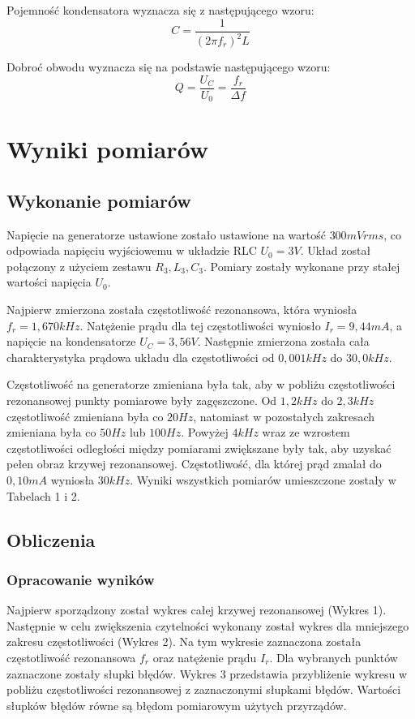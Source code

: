 \documentclass[polish, 11pt, a4paper]{article}
\begin{document}
		Pojemność kondensatora wyznacza się z następującego wzoru:
		\begin{equation}
			C	=	\frac{1}{(2\pi f_r)^2L}
		\end{equation}
		
		Dobroć obwodu wyznacza się na podstawie następującego wzoru:
		\begin{equation}
			Q=\frac{U_C}{U_0}=\frac{f_r}{\Delta f}
		\end{equation}
	\section{Wyniki pomiarów}

	\subsection{Wykonanie pomiarów}
		Napięcie na generatorze ustawione zostało ustawione na wartość \(300mVrms\), co odpowiada napięciu wyjściowemu w układzie RLC \(U_0=3V\).
		Układ został połączony z użyciem zestawu \(R_3, L_3, C_3\).
		Pomiary zostały wykonane przy stałej wartości napięcia \(U_0\).
		
		Najpierw zmierzona została częstotliwość rezonansowa, która wyniosła \(f_r=1,670kHz\).
		Natężenie prądu dla tej częstotliwości wyniosło \(I_r=9,44mA\), a napięcie na kondensatorze \(U_C=3,56V\).
		Następnie zmierzona została cała charakterystyka prądowa układu dla częstotliwości od \(0,001kHz\) do \(30,0kHz\).
		
		Częstotliwość na generatorze zmieniana była tak, aby w pobliżu częstotliwości rezonansowej punkty pomiarowe były zagęszczone.
		Od \(1,2 kHz\) do \(2,3kHz\) częstotliwość zmieniana była co \(20Hz\), natomiast w pozostałych zakresach zmieniana była co \(50Hz\) lub \(100Hz\).
		Powyżej \(4kHz\) wraz ze wzrostem częstotliwości odległości między pomiarami zwiększane były tak, aby uzyskać pełen obraz krzywej rezonansowej.
		Częstotliwość, dla której prąd zmalał do \(0,10mA\) wyniosła \(30kHz\). Wyniki wszystkich pomiarów umieszczone zostały w Tabelach 1 i 2.
	
	\subsection{Obliczenia}

	\subsubsection{Opracowanie wyników}
		Najpierw sporządzony został wykres całej krzywej rezonansowej (Wykres 1).
		Następnie w celu zwiększenia czytelności wykonany został wykres dla mniejszego zakresu częstotliwości (Wykres 2).
		Na tym wykresie zaznaczona została częstotliwość rezonansowa \(f_r\) oraz natężenie prądu \(I_r\).
		Dla wybranych punktów zaznaczone zostały słupki błędów. Wykres 3 przedstawia przybliżenie wykresu w pobliżu częstotliwości rezonansowej z zaznaczonymi słupkami błędów.
		Wartości słupków błędów równe są błędom pomiarowym użytych przyrządów.
		
\end{document}
